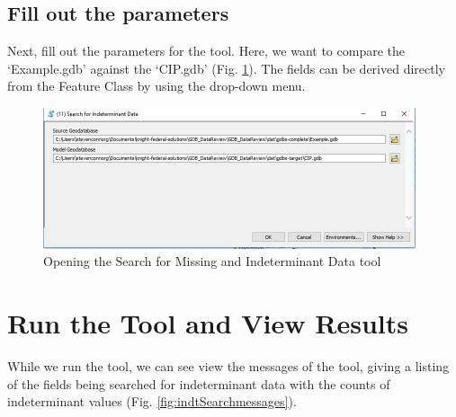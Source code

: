 \documentclass[openany]{book}
\theoremstyle{definition}
\theoremstyle{definition}
\theoremstyle{definition}
\theoremstyle{remark}
\begin{document}
\subsection{Fill out the parameters}\label{fill-out-the-parameters-8}

Next, fill out the parameters for the tool. Here, we want to compare the
`Example.gdb' against the `CIP.gdb' (Fig. \ref{fig:indtSearchparams}).
The fields can be derived directly from the Feature Class by using the
drop-down menu.

\begin{figure}[H]

{\centering \includegraphics[width=4.31in,]{figures/indtSearch-params} 

}

\caption{Opening the Search for Missing and Indeterminant Data tool}\label{fig:indtSearchparams}
\end{figure}

\section{Run the Tool and View
Results}\label{run-the-tool-and-view-results-8}

While we run the tool, we can see view the messages of the tool, giving
a listing of the fields being searched for indeterminant data with the
counts of indeterminant values (Fig. \ref{fig:indtSearchmessages}).
\end{document}
